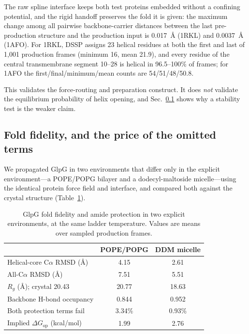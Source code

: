 \documentclass[journal=jctcce,manuscript=article,layout=twocolumn]{achemso}
\begin{document}
The raw spline interface keeps both test proteins embedded without a confining
potential, and the rigid handoff preserves the fold it is given: the maximum change
among all pairwise backbone-carrier distances between the last pre-production
structure and the production input is 0.017~\AA{} (1RKL) and 0.0037~\AA{} (1AFO).
For 1RKL, DSSP assigns 23 helical residues at both the first and last of 1{,}001
production frames (minimum 16, mean 21.9), and every residue of the central
transmembrane segment 10--28 is helical in 96.5--100\% of frames; for 1AFO the
first/final/minimum/mean counts are 54/51/48/50.8.

This validates the force-routing and preparation construct. It does \emph{not}
validate the equilibrium probability of helix opening, and Sec.~\ref{sec:fidelity}
shows why a stability test is the weaker claim.

\subsection{Fold fidelity, and the price of the omitted terms}
\label{sec:fidelity}

We propagated GlpG in two environments that differ only in the explicit
environment---a POPE/POPG bilayer and a dodecyl-maltoside micelle---using the
identical protein force field and interface, and compared both against the crystal
structure (Table~\ref{tab:fidelity}).

\begin{table}[ht]
\centering
\small
\caption{GlpG fold fidelity and amide protection in two explicit environments, at
the same ladder temperature. Values are means over sampled production frames.}
\label{tab:fidelity}
\begin{tabular}{lcc}
\toprule
 & POPE/POPG & DDM micelle \\
\midrule
Helical-core C$\alpha$ RMSD (\AA)   & 4.15 & 2.61 \\
All-C$\alpha$ RMSD (\AA)            & 7.51 & 5.51 \\
$R_g$ (\AA); crystal 20.43          & 20.77 & 18.63 \\
Backbone H-bond occupancy           & 0.844 & 0.952 \\
Both protection terms fail          & 3.34\% & 0.93\% \\
Implied $\Delta G_\mathrm{op}$ (kcal/mol) & 1.99 & 2.76 \\
\bottomrule
\end{tabular}
\end{table}
\end{document}
